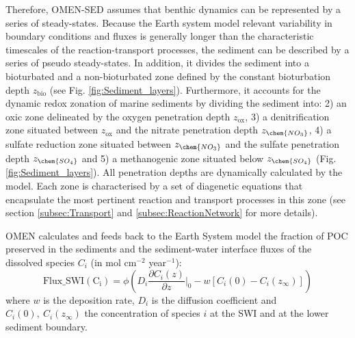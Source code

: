 \documentclass[gmd, manuscript]{copernicus}
\begin{document}
Therefore, OMEN-SED assumes that benthic dynamics can be represented by a series of steady-states. 
Because the Earth system model relevant variability in boundary conditions and fluxes is generally longer than the characteristic timescales of the reaction-transport processes, the sediment can be described by a 
series of pseudo steady-states. In addition, it divides the sediment into a bioturbated and a non-bioturbated zone defined by the constant bioturbation depth $z_{\mathrm{bio}}$ (see Fig. \ref{fig:Sediment_layers}). 
Furthermore, it accounts for the dynamic redox zonation of marine sediments by dividing the sediment into: 2) an oxic zone delineated by the oxygen 
penetration depth $z_{\mathrm{ox}}$, 3) a denitrification zone situated between $z_{\mathrm{ox}}$ and the nitrate penetration depth $z_{\chem{NO_3}}$, 4) 
a sulfate reduction zone situated between $z_{\chem{NO_3}}$ and the sulfate penetration depth $z_{\chem{SO_4}}$ and 5) a methanogenic zone situated below $z_{\chem{SO_4}}$ (Fig. \ref{fig:Sediment_layers}). 
All penetration depths are dynamically calculated by the model. 
Each zone is characterised by a set of diagenetic equations that encapsulate the most pertinent reaction and transport processes in this zone (see section \ref{subsec:Transport} and \ref{subsec:ReactionNetwork} 
for more details). 

OMEN calculates and feeds back to the Earth System model the fraction of POC preserved in the sediments and the sediment-water interface fluxes of the dissolved species $C_i$ (in mol cm$^{-2}$ year$^{-1}$):
\begin{equation}
\mathrm{Flux\_SWI(C_i)} = \phi \left(D_i \frac{\partial C_i(z)}{\partial z}\bigg\rvert_0 - w \left[ C_i(0) - C_i(z_\infty) \right]\right)
\end{equation}
where $w$ is the deposition rate, $D_i$ is the diffusion coefficient and $C_i(0),\ C_i(z_\infty)$ the concentration of species $i$ at the SWI and at the lower sediment boundary. 
\end{document}
